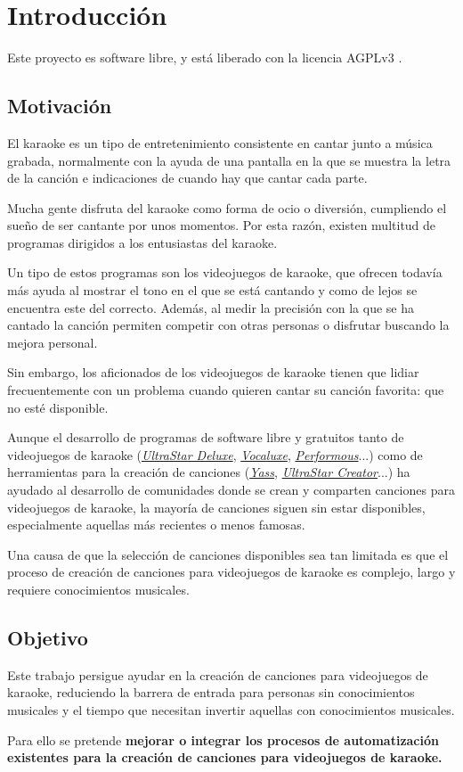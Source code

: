 \chapter{Introducción}

Este proyecto es software libre, y está liberado con la licencia AGPLv3 \cite{agpl}.

\section{Motivación}

El karaoke es un tipo de entretenimiento consistente en cantar junto a música grabada, normalmente con la ayuda de una pantalla en la que se muestra la letra de la canción e indicaciones de cuando hay que cantar cada parte.

Mucha gente disfruta del karaoke como forma de ocio o diversión, cumpliendo el sueño de ser cantante por unos momentos. Por esta razón, existen multitud de programas dirigidos a los entusiastas del karaoke.

Un tipo de estos programas son los videojuegos de karaoke, que ofrecen todavía más ayuda al mostrar el tono en el que se está cantando y como de lejos se encuentra este del correcto. Además, al medir la precisión con la que se ha cantado la canción permiten competir con otras personas o disfrutar buscando la mejora personal.

Sin embargo, los aficionados de los videojuegos de karaoke tienen que lidiar frecuentemente con un problema cuando quieren cantar su canción favorita: que no esté disponible.

Aunque el desarrollo de programas de software libre y gratuitos tanto de videojuegos de karaoke (\href{https://github.com/UltraStar-Deluxe/USDX}{\textit{UltraStar Deluxe}}, \href{https://github.com/Vocaluxe/Vocaluxe}{\textit{Vocaluxe}}, \href{https://github.com/performous/performous}{\textit{Performous}}...) como de herramientas para la creación de canciones (\href{https://github.com/sarutasan72/Yass}{\textit{Yass}}, \href{https://github.com/UltraStar-Deluxe/UltraStar-Creator}{\textit{UltraStar Creator}}...) ha ayudado al desarrollo de comunidades donde se crean y comparten canciones para videojuegos de karaoke, la mayoría de canciones siguen sin estar disponibles, especialmente aquellas más recientes o menos famosas.

Una causa de que la selección de canciones disponibles sea tan limitada es que el proceso de creación de canciones para videojuegos de karaoke es complejo, largo y requiere conocimientos musicales.


\section{Objetivo}

Este trabajo persigue ayudar en la creación de canciones para videojuegos de karaoke, reduciendo la barrera de entrada para personas sin conocimientos musicales y el tiempo que necesitan invertir aquellas con conocimientos musicales.


Para ello se pretende \textbf{mejorar o integrar los procesos de automatización existentes para la creación de canciones para videojuegos de karaoke.}